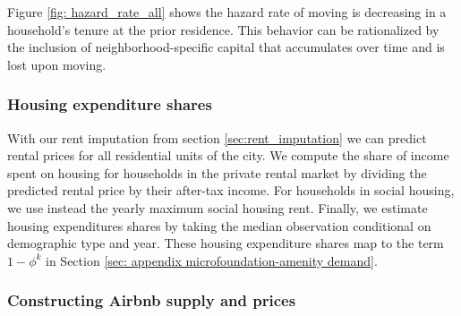 \documentclass[11pt]{article}
\begin{document}
Figure \ref{fig: hazard_rate_all} shows the hazard rate of moving is decreasing in a household's tenure at the prior residence. This behavior can be rationalized by the inclusion of neighborhood-specific capital that accumulates over time and is lost upon moving.


\subsubsection{Housing expenditure shares}\label{sec: consumption shares}
With our rent imputation from section \ref{sec:rent_imputation} we can predict rental prices for all residential units of the city. We compute the share of income spent on housing for households in the private rental market by dividing the predicted rental price by their after-tax income. For households in social housing, we use instead the yearly maximum social housing rent. Finally, we estimate housing expenditures shares by taking the median observation conditional on demographic type and year. These housing expenditure shares map to the term $1- \phi^k$ in Section \ref{sec: appendix microfoundation-amenity demand}.

\subsubsection{Constructing Airbnb supply and prices}\label{sec: appendix data - airbnb} 
\end{document}
